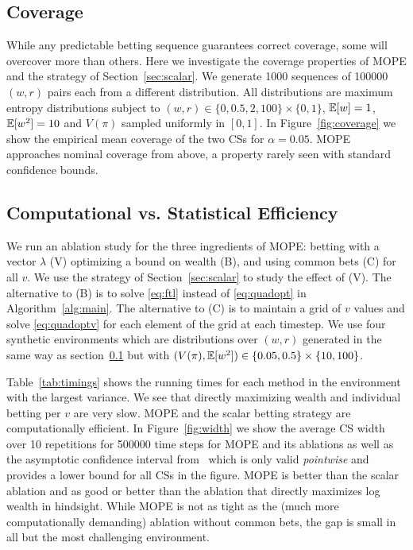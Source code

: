 \subsection{Coverage} \label{sec:coverage}
While any predictable betting sequence
guarantees correct coverage, some will overcover more than
others. Here we investigate the coverage properties of
MOPE and the strategy of Section~\ref{sec:scalar}.
We generate 1000 sequences of 100000 $(w,r)$ pairs each from a different
distribution. All distributions are maximum entropy distributions subject to
$(w,r) \in \{0, 0.5, 2, 100\} \times \{0,1\}$, $\mathbb{E}[w]=1$, $\mathbb{E}[w^2]=10$
and $V(\pi)$ sampled uniformly in $[0,1]$. In Figure~\ref{fig:coverage} we show
the empirical mean coverage of the two CSs for $\alpha=0.05$. 
MOPE approaches nominal coverage from above,
a property rarely seen with standard confidence bounds.

\subsection{Computational vs. Statistical Efficiency}
We run an ablation study for the three ingredients of MOPE:
betting with a vector $\lambda$ (V)
optimizing a bound on wealth (B), 
and using common bets (C) for all $v$. We use 
the strategy of Section~\ref{sec:scalar} to study
the effect of (V). The alternative to (B) is to 
solve \eqref{eq:ftl} instead of \eqref{eq:quadopt} in
Algorithm~\ref{alg:main}.
The alternative to (C) is to maintain a 
grid of $v$ values and solve
\eqref{eq:quadoptv} for each element of the grid
at each timestep. We use four synthetic environments
which are distributions over $(w,r)$ generated in the same way as section~\ref{sec:coverage} but
with $(V(\pi),\mathbb{E}[w^2]) \in \{0.05, 0.5\} \times \{10, 100\}$.

Table~\ref{tab:timings}
shows the running times for each method in the environment with 
the largest variance. We see that directly 
maximizing wealth and individual betting per $v$ are very slow.
MOPE and the scalar betting strategy are computationally efficient.
In Figure~\ref{fig:width} we show the 
average CS width over 10 repetitions for 500000 time steps
for MOPE and its ablations as well as the 
asymptotic confidence interval from~\cite{karampatziakis2019empirical}
which is only valid \emph{pointwise} and provides a lower bound for
all CSs in the figure. MOPE is better than the 
scalar ablation and as good or better than the 
ablation that directly maximizes log wealth in hindsight.
While MOPE is not as tight as
the (much more computationally demanding) 
ablation without common bets, the gap is small in all 
but the most challenging environment.


